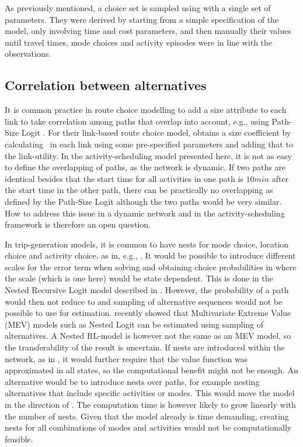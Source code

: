 As previously mentioned, a choice set is sampled using  with a single set of parameters. They were derived by starting from a simple specification of the model, only involving time and cost parameters, and then manually their values until travel times, mode choices and activity episodes were in line with the observations.

\subsection{Correlation between alternatives}
It is common practice in route choice modelling to add a size attribute to each link to take correlation among paths that overlap into account, e.g., using Path-Size Logit \citep{BenAkivaBier99}. For their link-based route choice model, \citet{fosgerau11} obtains a size coefficient by calculating \eutil\, in each link using some pre-specified parameters and adding that to the link-utility. In the activity-scheduling model presented here, it is not as easy to define the overlapping of paths, as the network is dynamic. If two paths are identical besides that the start time for all activities in one path is $10\unit{min}$ after the start time in the other path, there can be practically no overlapping as defined by the Path-Size Logit although the two paths would be very similar. How to address this issue in a dynamic network and in the activity-scheduling framework is therefore an open question.

In trip-generation models, it is common to have nests for mode choice, location choice and activity choice, as in, e.g., \citet{Bowman01}. It would be possible to introduce different scales for the error term when solving  and obtaining choice probabilities in  where the scale (which is one here) would be state dependent. This is done in the Nested Recursive Logit model described in \citet{mai2015}. However, the probability of a path would then not reduce to   and sampling of alternative sequences would not be possible to use for estimation.
\citet{guevara2013MEV} recently showed that Multivariate Extreme Value (MEV) models such as Nested Logit can be estimated using sampling of alternatives. A Nested RL-model is however not the same as an MEV model, so the transferability of the result is uncertain. If nests are introduced within the network, as in \citet{mai2015}, it would further require that the value function was approximated in all states, so the computational benefit might not be enough. An alternative would be to introduce nests over paths, for example nesting alternatives that include specific activities or modes. This would move the model in the direction of \citet{Bowman01}. The computation time is however likely to grow linearly with the number of nests. Given that the model already is time demanding, creating nests for all combinations of modes and activities would not be computationally feasible.

